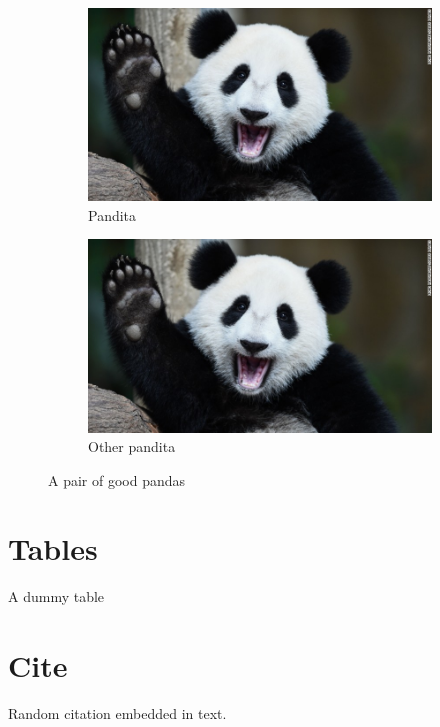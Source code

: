 \documentclass{article}
\begin{document}
\begin{figure}[h!]
    \centering
    \begin{subfigure}[b]{0.4\linewidth} %
        \includegraphics[width=\linewidth]{images/panda.jpg}
        \caption{Pandita}
    \end{subfigure}
    \begin{subfigure}[b]{0.4\linewidth}
        \includegraphics[width=\linewidth]{images/panda.jpg}
        \caption{Other pandita}
    \end{subfigure}
    \caption{A pair of good pandas}
\end{figure}

\section{Tables}

\begin{table}
    \caption{A dummy table}
\end{table}

\section{Cite}
Random citation \autocite{DUMMY:1} embedded in text.
\end{document}
